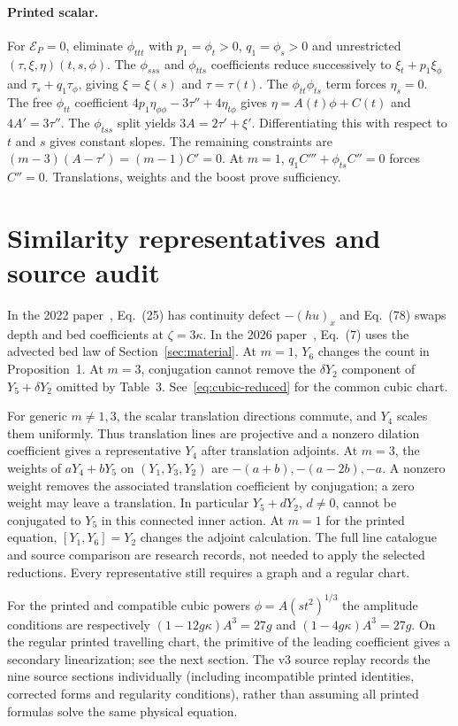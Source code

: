 \documentclass[12pt,a4paper,oneside]{report}
\numberwithin{equation}{chapter}
\theoremstyle{definition}
\theoremstyle{remark}\newtheorem{remark}[theorem]{Remark}
\newif\ifreviewmarks
\DeclareRobustCommand{\review}[1]{{\ifreviewmarks\color{authorblue}\fi #1}}
\begin{document}
\paragraph{Printed scalar.}
For $\mathcal E_{P}=0$, eliminate $\phi_{ttt}$ with $p_1=\phi_t>0$, $q_1=\phi_s>0$ and unrestricted $(\tau,\xi,\eta)(t,s,\phi)$. The $\phi_{sss}$ and $\phi_{tts}$ coefficients reduce successively to $\xi_t+p_1\xi_\phi$ and $\tau_s+q_1\tau_\phi$, giving $\xi=\xi(s)$ and $\tau=\tau(t)$. The $\phi_{tt}\phi_{ts}$ term forces $\eta_s=0$. The free $\phi_{tt}$ coefficient $4p_1\eta_{\phi\phi}-3\tau''+4\eta_{t\phi}$ gives $\eta=A(t)\phi+C(t)$ and $4A'=3\tau''$. The $\phi_{tss}$ split yields $3A=2\tau'+\xi'$. Differentiating this with respect to $t$ and $s$ gives constant slopes. The remaining constraints are $(m-3)(A-\tau')=(m-1)C'=0$. At $m=1$, $q_1C'''+\phi_{ts}C''=0$ forces $C''=0$. Translations, weights and the boost prove sufficiency.

\smallskip
\section{Similarity representatives and source audit}\label{app:audit}\label{app:optimal}
In the 2022 paper~\cite{sve2022}, Eq.~(25) has continuity defect $-(hu)_x$ and Eq.~(78) swaps depth and bed coefficients at $\zeta=3\kappa$. In the 2026 paper~\cite{sve2026}, Eq.~(7) uses the advected bed law of Section~\ref{sec:material}. At $m=1$, $Y_6$ changes the count in Proposition~1. At $m=3$, conjugation cannot remove the $\delta Y_2$ component of $Y_5+\delta Y_2$ omitted by Table~3. See~\eqref{eq:cubic-reduced} for the common cubic chart.


\review{For generic $m\ne1,3$, the scalar translation directions commute, and $Y_4$ scales them uniformly. Thus translation lines are projective and a nonzero dilation coefficient gives a representative $Y_4$ after translation adjoints. At $m=3$, the weights of $aY_4+bY_5$ on $(Y_1,Y_3,Y_2)$ are $-(a+b),-(a-2b),-a$. A nonzero weight removes the associated translation coefficient by conjugation; a zero weight may leave a translation. In particular $Y_5+dY_2$, $d\ne0$, cannot be conjugated to $Y_5$ in this connected inner action. At $m=1$ for the printed equation, $[Y_1,Y_6]=Y_2$ changes the adjoint calculation. The full line catalogue and source comparison are research records, not needed to apply the selected reductions. Every representative still requires a graph and a regular chart.}

For the printed and compatible cubic powers $\phi=A(st^2)^{1/3}$ the amplitude conditions are respectively $(1-12g\kappa)A^3=27g$ and $(1-4g\kappa)A^3=27g$. On the regular printed travelling chart, the primitive of the leading coefficient gives a secondary linearization; see the next section. The v3 source replay records the nine source sections individually (including incompatible printed identities, corrected forms and regularity conditions), rather than assuming all printed formulas solve the same physical equation.
\end{document}
